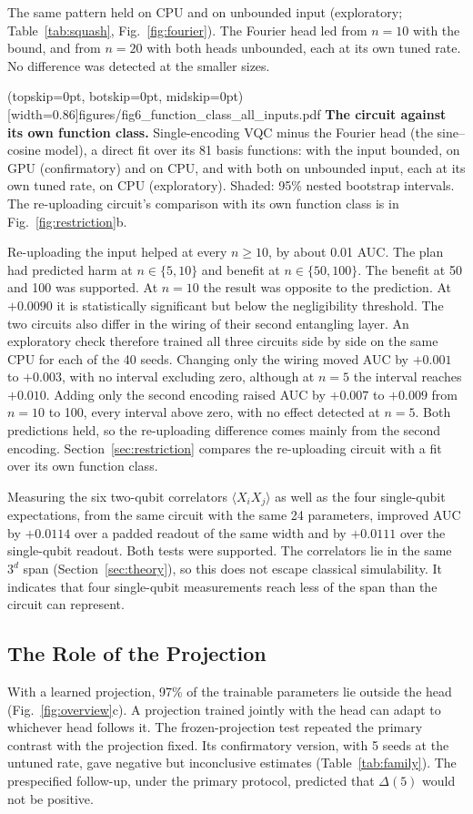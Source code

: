 \documentclass{ieeeaccess}
\newcommand{\vqc}{VQC}
\begin{document}
The same pattern held on CPU and on unbounded input (exploratory; Table~\ref{tab:squash}, Fig.~\ref{fig:fourier}). The Fourier head led from $n=10$ with the bound, and from $n=20$ with both heads unbounded, each at its own tuned rate. No difference was detected at the smaller sizes.

\Figure[t!](topskip=0pt, botskip=0pt, midskip=0pt)[width=0.86\columnwidth]{figures/fig6_function_class_all_inputs.pdf}
{\textbf{The circuit against its own function class.} Single-encoding \vqc{} minus the Fourier head (the sine--cosine model), a direct fit over its 81 basis functions: with the input bounded, on GPU (confirmatory) and on CPU, and with both on unbounded input, each at its own tuned rate, on CPU (exploratory). Shaded: 95\% nested bootstrap intervals. The re-uploading circuit's comparison with its own function class is in Fig.~\ref{fig:restriction}b.\label{fig:fourier}}

Re-uploading the input helped at every $n\ge10$, by about 0.01 AUC. The plan had predicted harm at $n\in\{5,10\}$ and benefit at $n\in\{50,100\}$. The benefit at 50 and 100 was supported. At $n=10$ the result was opposite to the prediction. At $+0.0090$ it is statistically significant but below the negligibility threshold. The two circuits also differ in the wiring of their second entangling layer. An exploratory check therefore trained all three circuits side by side on the same CPU for each of the 40 seeds. Changing only the wiring moved AUC by $+0.001$ to $+0.003$, with no interval excluding zero, although at $n=5$ the interval reaches $+0.010$. Adding only the second encoding raised AUC by $+0.007$ to $+0.009$ from $n=10$ to 100, every interval above zero, with no effect detected at $n=5$. Both predictions held, so the re-uploading difference comes mainly from the second encoding. Section~\ref{sec:restriction} compares the re-uploading circuit with a fit over its own function class.

Measuring the six two-qubit correlators $\langle X_iX_j\rangle$ as well as the four single-qubit expectations, from the same circuit with the same 24 parameters, improved AUC by $+0.0114$ over a padded readout of the same width and by $+0.0111$ over the single-qubit readout. Both tests were supported. The correlators lie in the same $3^d$ span (Section~\ref{sec:theory}), so this does not escape classical simulability. It indicates that four single-qubit measurements reach less of the span than the circuit can represent.

\subsection{The Role of the Projection}
\label{sec:projection}
With a learned projection, 97\% of the trainable parameters lie outside the head (Fig.~\ref{fig:overview}c). A projection trained jointly with the head can adapt to whichever head follows it. The frozen-projection test repeated the primary contrast with the projection fixed. Its confirmatory version, with 5 seeds at the untuned rate, gave negative but inconclusive estimates (Table~\ref{tab:family}). The prespecified follow-up, under the primary protocol, predicted that $\Delta(5)$ would not be positive.
\end{document}
